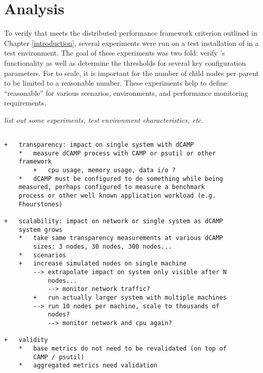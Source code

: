 \chapter{Analysis}
\label{analysis}

To verify that \dcamp meets the distributed performance framework criterion outlined in Chapter \ref{introduction},
several experiments were run on a test installation of \dcamp in a test environment. The goal of these experiments was
two fold: verify \dcamp's functionality as well as determine the thresholds for several key configuration parameters.
For \dcamp to scale, it is important for the number of child nodes per parent to be limited to a reasonable number.
These experiments help to define ``reasonable'' for various scenarios, environments, and performance monitoring
requirements.

\emph{list out some experiments, test environment characteristics, etc.}

\begin{lstlisting}

+   transparency: impact on single system with dCAMP
    *   measure dCAMP process with CAMP or psutil or other
	framework
        +   cpu usage, memory usage, data i/o ?
    *   dCAMP must be configured to do something while being
	measured, perhaps configured to measure a benchmark
	process or other well known application workload (e.g.
	Fhourstones)

+   scalability: impact on network or single system as dCAMP
    system grows
    *   take same transparency measurements at various dCAMP
        sizes: 3 nodes, 30 nodes, 300 nodes...
    *   scenarios
	+   increase simulated nodes on single machine
	    --> extrapolate impact on system only visible after N
	        nodes...
            --> monitor network traffic?
        +   run actually larger system with multiple machines
	    --> run 10 nodes per machine, scale to thousands of
	        nodes?
            --> monitor network and cpu again?

+   validity
    *   base metrics do not need to be revalidated (on top of
        CAMP / psutil)
    *   aggregated metrics need validation

\end{lstlisting}

